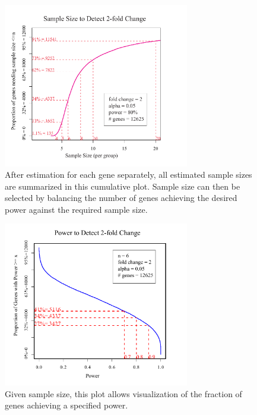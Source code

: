 \documentclass{bioinfo}
\begin{document}
\begin{figure}[h]
  \centerline{\includegraphics*[width=3.2in]{CumPlotP.pdf}}
  \caption[Effect of Sample Size on Power]{
    After estimation for each gene separately, all estimated sample
    sizes are summarized in this cumulative plot. Sample size can then
    be selected by balancing the number of genes achieving the desired
    power against the required sample size.}
  \label{fig:CumNPlot}
\end{figure}

\begin{figure}[h]
  \centerline{\includegraphics*[width=3.2in]{CumPowerPlotP.pdf}}
  \caption[Given Sample Size, Fraction of Genes Achieving a Specified Power]{
  Given sample size, this plot allows visualization of the fraction of genes achieving a specified power.}
  \label{fig:CumPowerPlot}
\end{figure}
\end{document}
